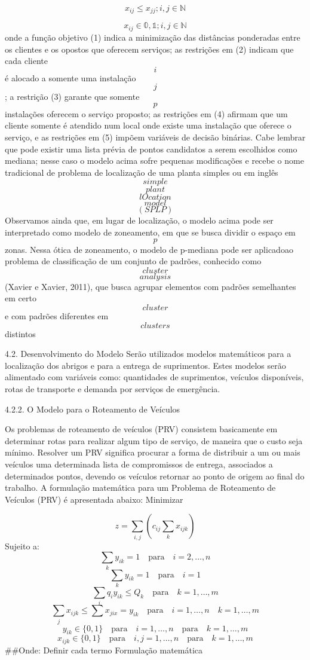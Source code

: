 \documentclass[
]{article}
\begin{document}
\[
x_{ij} \leq x_{jj}; i,j \in \mathbb{N}
\]

\[
x_{ij} \in \mathbb{0,1}; i,j \in \mathbb{N}
\] onde a função objetivo (1) indica a minimização das distâncias
ponderadas entre os clientes e os opostos que oferecem serviços; as
restrições em (2) indicam que cada cliente \[i\] é alocado a somente uma
instalação \[j\] ; a restrição (3) garante que somente \[
p
\] instalações oferecem o serviço proposto; as restrições em (4) afirmam
que um cliente somente é atendido num local onde existe uma instalação
que oferece o serviço, e as restrições em (5) impõem variáveis de
decisão binárias. Cabe lembrar que pode existir uma lista prévia de
pontos candidatos a serem escolhidos como mediana; nesse caso o modelo
acima sofre pequenas modificações e recebe o nome tradicional de
problema de localização de uma planta simples ou em inglês \[ simple \]
\[ plant \] \[ lOcation \] \[ model \] \[(SPLP)\] Observamos ainda que,
em lugar de localização, o modelo acima pode ser interpretado como
modelo de zoneamento, em que se busca dividir o espaço em \[
p\] zonas. Nessa ótica de zoneamento, o modelo de p-mediana pode ser
aplicadoao problema de classificação de um conjunto de padrões,
conhecido como \[cluster\] \[analysis\] (Xavier e Xavier, 2011), que
busca agrupar elementos com padrões semelhantes em certo \[ cluster \] e
com padrões diferentes em \[ clusters \] distintos

4.2. Desenvolvimento do Modelo Serão utilizados modelos matemáticos para
a localização dos abrigos e para a entrega de suprimentos. Estes modelos
serão alimentado com variáveis como: quantidades de suprimentos,
veículos disponíveis, rotas de transporte e demanda por serviços de
emergência.

4.2.2. O Modelo para o Roteamento de Veículos

Os problemas de roteamento de veículos (PRV) consistem basicamente em
determinar rotas para realizar algum tipo de serviço, de maneira que o
custo seja mínimo. Resolver um PRV significa procurar a forma de
distribuir a um ou mais veículos uma determinada lista de compromissos
de entrega, associados a determinados pontos, devendo os veículos
retornar ao ponto de origem ao final do trabalho. A formulação
matemática para um Problema de Roteamento de Veículos (PRV) é
apresentada abaixo: Minimizar

\[
z=\sum_{i,j}(c_{ij}\sum_{k}x_{ijk})
\] Sujeito a: \[
\sum_{k}y_{ik}=1 \quad \text{para} \quad  i=2, \dots,n
\] \[
\sum_{k}y_{ik}=1\quad \text{para} \quad  i=1
\] \[
\sum_{i}q_{i}y_{ik} \leq Q_{k} \quad \text{para} \quad  k=1, \dots,m
\] \[
\sum_{j}x_{ijk} \leq\sum x_{jix}=y_{ik} \quad \text{para}\quad i=1,\dots,n\quad k=1,\dots,m
\] \[
y_{ik} \in \{0,1\}\quad\text{para}\quad i=1,\dots,n\quad\text{para}\quad k=1,\dots,m
\] \[
x_{ijk} \in \{0,1\}\quad\text{para}\quad i,j=1,\dots,n\quad\text{para}\quad k=1,\dots,m
\] \#\#Onde: Definir cada termo Formulação matemática
\end{document}
